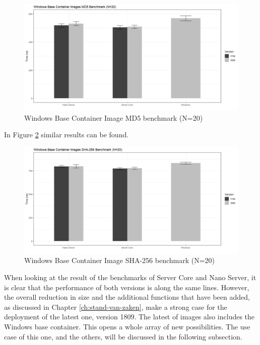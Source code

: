 \begin{figure}[h]
	\captionsetup{width=0.8\linewidth}
	\includegraphics[width=0.9\linewidth]{img/Methodologie/Containers1.png}
	\centering
	\caption[MD5 benchmark]{Windows Base Container Image MD5 benchmark (N=20)}
	\label{fig:MD5}
\end{figure}

In Figure \ref{fig:SHA} similar results can be found. 

\begin{figure}[h]
	\captionsetup{width=0.8\linewidth}
	\includegraphics[width=0.9\linewidth]{img/Methodologie/Containers2.png}
	\centering
	\caption[SHA-256 benchmark]{Windows Base Container Image SHA-256 benchmark (N=20)}
	\label{fig:SHA}
\end{figure}

 When looking at the result of the benchmarks of Server Core and Nano Server, it is clear that the performance of both versions is along the same lines. However, the overall reduction in size and the additional functions that have been added, as discussed in Chapter \ref{ch:stand-van-zaken}, make a strong case for the deployment of the latest one, version 1809. The latest of images also includes the Windows base container. This opens a whole array of new possibilities. The use case of this one, and the others, will be discussed in the following subsection.

